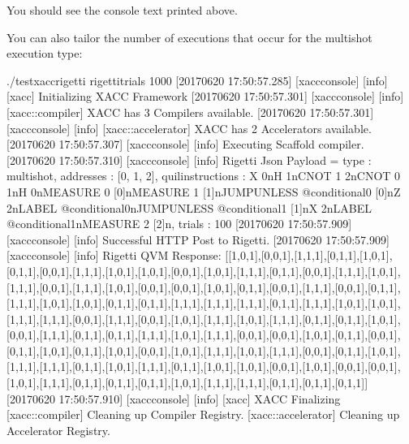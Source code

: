 \documentclass[letterpaper,10pt,english]{sphinxmanual}
\begin{document}
You should see the console text printed above.

You can also tailor the number of executions that occur for the multishot execution type:

\begin{sphinxVerbatim}[commandchars=\\\{\}]
\PYGZdl{} ./test\PYGZhy{}xacc\PYGZhy{}rigetti \PYGZhy{}\PYGZhy{}rigetti\PYGZhy{}trials 1000
[2017\PYGZhy{}06\PYGZhy{}20 17:50:57.285] [xacc\PYGZhy{}console] [info] [xacc] Initializing XACC Framework
[2017\PYGZhy{}06\PYGZhy{}20 17:50:57.301] [xacc\PYGZhy{}console] [info] [xacc::compiler] XACC has 3 Compilers available.
[2017\PYGZhy{}06\PYGZhy{}20 17:50:57.301] [xacc\PYGZhy{}console] [info] [xacc::accelerator] XACC has 2 Accelerators available.
[2017\PYGZhy{}06\PYGZhy{}20 17:50:57.307] [xacc\PYGZhy{}console] [info] Executing Scaffold compiler.
[2017\PYGZhy{}06\PYGZhy{}20 17:50:57.310] [xacc\PYGZhy{}console] [info] Rigetti Json Payload = \PYGZob{} \PYGZdq{}type\PYGZdq{} : \PYGZdq{}multishot\PYGZdq{}, \PYGZdq{}addresses\PYGZdq{} : [0, 1, 2], \PYGZdq{}quil\PYGZhy{}instructions\PYGZdq{} : \PYGZdq{}X 0\PYGZbs{}nH 1\PYGZbs{}nCNOT 1 2\PYGZbs{}nCNOT 0 1\PYGZbs{}nH 0\PYGZbs{}nMEASURE 0 [0]\PYGZbs{}nMEASURE 1 [1]\PYGZbs{}nJUMP\PYGZhy{}UNLESS @conditional\PYGZus{}0 [0]\PYGZbs{}nZ 2\PYGZbs{}nLABEL @conditional\PYGZus{}0\PYGZbs{}nJUMP\PYGZhy{}UNLESS @conditional\PYGZus{}1 [1]\PYGZbs{}nX 2\PYGZbs{}nLABEL @conditional\PYGZus{}1\PYGZbs{}nMEASURE 2 [2]\PYGZbs{}n\PYGZdq{}, \PYGZdq{}trials\PYGZdq{} : 100 \PYGZcb{}
[2017\PYGZhy{}06\PYGZhy{}20 17:50:57.909] [xacc\PYGZhy{}console] [info] Successful HTTP Post to Rigetti.
[2017\PYGZhy{}06\PYGZhy{}20 17:50:57.909] [xacc\PYGZhy{}console] [info] Rigetti QVM Response:
[[1,0,1],[0,0,1],[1,1,1],[0,1,1],[1,0,1],[0,1,1],[0,0,1],[1,1,1],[1,0,1],[1,0,1],[0,0,1],[1,0,1],[1,1,1],[0,1,1],[0,0,1],[1,1,1],[1,0,1],[1,1,1],[0,0,1],[1,1,1],[1,0,1],[0,0,1],[0,0,1],[1,0,1],[0,1,1],[0,0,1],[1,1,1],[0,0,1],[0,1,1],[1,1,1],[1,0,1],[1,0,1],[0,1,1],[0,1,1],[1,1,1],[1,1,1],[1,1,1],[0,1,1],[1,1,1],[1,0,1],[1,0,1],[1,1,1],[1,1,1],[0,0,1],[1,1,1],[0,0,1],[1,0,1],[1,1,1],[1,0,1],[1,1,1],[0,1,1],[0,1,1],[1,0,1],[0,0,1],[1,1,1],[0,1,1],[0,1,1],[1,1,1],[1,0,1],[1,1,1],[0,0,1],[0,0,1],[1,0,1],[0,1,1],[0,0,1],[0,1,1],[1,0,1],[0,1,1],[1,0,1],[0,0,1],[1,0,1],[1,1,1],[1,0,1],[1,1,1],[0,0,1],[0,1,1],[1,0,1],[1,1,1],[1,1,1],[0,1,1],[1,0,1],[1,1,1],[0,1,1],[1,0,1],[1,0,1],[0,0,1],[1,0,1],[0,0,1],[0,0,1],[1,0,1],[1,1,1],[0,1,1],[0,1,1],[0,1,1],[1,0,1],[1,1,1],[1,1,1],[0,1,1],[0,1,1],[0,1,1]]
[2017\PYGZhy{}06\PYGZhy{}20 17:50:57.910] [xacc\PYGZhy{}console] [info]
[xacc] XACC Finalizing
[xacc::compiler] Cleaning up Compiler Registry.
[xacc::accelerator] Cleaning up Accelerator Registry.
\end{sphinxVerbatim}
\end{document}
